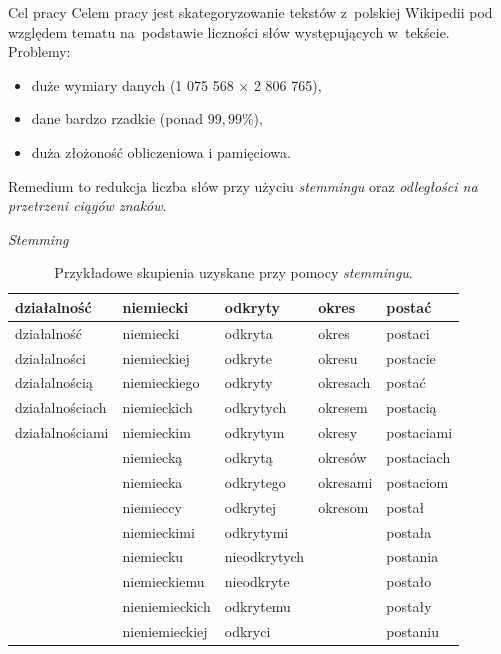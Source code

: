 \documentclass[11pt,pdftex,mathserif]{beamer}
\theoremstyle{definition}
\begin{document}
\begin{frame}{Cel pracy}
Celem pracy jest skategoryzowanie tekstów z~polskiej Wikipedii pod względem tematu na~podstawie liczności słów występujących w~tekście. %
\pause
Problemy:
\begin{itemize}
\item duże wymiary danych (1 075 568 $\times$ 2 806 765),
\item dane bardzo rzadkie (ponad $99{,}99\%$),
\item duża złożoność obliczeniowa i pamięciowa.
\end{itemize}
\pause
Remedium to redukcja liczba słów przy użyciu \emph{stemmingu} oraz \emph{odległości na przetrzeni ciągów znaków}.
\end{frame}



\begin{frame}{\emph{Stemming}}
\begin{table}[h]
\centering
\caption{Przykładowe skupienia uzyskane przy pomocy \emph{stemmingu}.}
\begin{tabular}{|lllll|}
  \hline
działalność & niemiecki & odkryty & okres & postać \\ 
  \hline
działalność & niemiecki & odkryta & okres & postaci \\ 
  działalności & niemieckiej & odkryte & okresu & postacie \\ 
  działalnością & niemieckiego & odkryty & okresach & postać \\ 
  działalnościach & niemieckich & odkrytych & okresem & postacią \\ 
  działalnościami & niemieckim & odkrytym & okresy & postaciami \\ 
   & niemiecką & odkrytą & okresów & postaciach \\ 
   & niemiecka & odkrytego & okresami & postaciom \\ 
   & niemieccy & odkrytej & okresom & postał \\ 
   & niemieckimi & odkrytymi &  & postała \\ 
   & niemiecku & nieodkrytych &  & postania \\ 
   & niemieckiemu & nieodkryte &  & postało \\ 
   & nieniemieckich & odkrytemu &  & postały \\ 
   & nieniemieckiej & odkryci &  & postaniu \\ 
   \hline
\end{tabular}
\end{table}

\end{frame}
\end{document}
